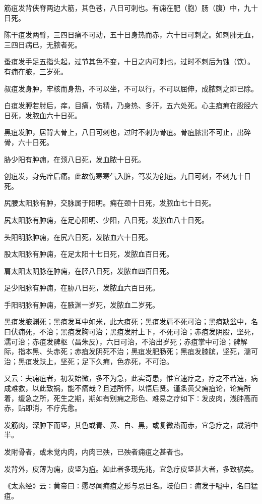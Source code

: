 \documentclass[a4paper,12pt,UTF8,twoside]{ctexbook}
\begin{document}
筋疽发背侠脊两边大筋，其色苍，八日可刺也。有痈在肥（胞）肠（腹）中，九十日死。

陈干疽发两臂，三四日痛不可动，五十日身热而赤，六十日可刺之。如刺肺无血，三四日病已，无脓者死。

蚤疽发手足五指头起，过节其色不变，十日之内可刺也，过时不刺后为蚀（饮）。有痈在腋，三岁死。

叔疽发身肿，牢核而身热，不可以坐，不可以行，不可以屈伸，成脓刺之即已除。

白疽发膊若肘后，痒，目痛，伤精，乃身热、多汗，五六处死。心主疽痈在股胫六日死，发脓血六十日死。

黑疽发肿，居背大骨上，八日可刺也，过时不刺为骨疽。骨疽脓出不可止，出碎骨，六十日死。

胁少阳有肿痈，在颈八日死，发血脓十日死。

创疽发，身先痒后痛。此故伤寒寒气入脏，笃发为创疽。九日可刺，不刺九十日死。

尻腰太阳脉有肿，交脉属于阳明。痈在颈十日死，发脓血七十日死。

尻太阳脉有肿痈，在足心阳明、少阳，八日死，发脓血八十日死。

头阳明脉肿痈，在尻六日死，发脓血六十日死。

股太阳脉有肿痈，在足太阳十七日死，发脓血百日死。

肩太阳太阴脉在肿痈，在胫八日死，发脓血四百日死。

足少阳脉有肿痈，在胁八日死，发脓血六百日死。

手阳明脉有肿痈，在腋渊一岁死，发脓血二岁死。

黑疽发腋渊死；黑疽发耳中如米，此大疽死；黑疽发肩不死可治；黑疽缺盆中，名曰伏痈死，不治；黑疽发胸可治；黑疽发肘上下，不死可治；赤疽发阴股，坚死，濡可治；赤疽发髀枢（昌朱反），六日可治，不治出岁死；赤疽掌中可治；髀解际，指本黑、头赤死；赤疽发阴死不治；黑疽发肥肠死；黑疽发膝膑，坚死，濡可治；黑疽发趺上，坚死；足下久痈，色赤死，不可治。

又云∶夫痈疽者，初发始微，多不为急，此实奇患，惟宜速疗之，疗之不若速，病成难救，以此致祸，能不痛哉？且述所怀，以悟后贤。谨条黄父痈疽论，论痈所着，缓急之所，死生之期，期如有别痈之形色、难易之疗如下∶发皮肉，浅肿高而赤，贴即消，不疗先愈。

发筋肉，深肿下而坚，其色或青、黄、白、黑，或复微热而赤，宜急疗之，成消中半。

发附骨者，或未觉内肉，内肉已殃，已殃者痈疽之甚者也。

发背外，皮薄为痈，皮坚为疽。如此者多现先兆，宜急疗皮坚甚大者，多致祸矣。

《太素经》云∶黄帝曰∶愿尽闻痈疽之形与忌日名。岐伯曰∶痈发于嗌中，名曰猛疽。
\end{document}
